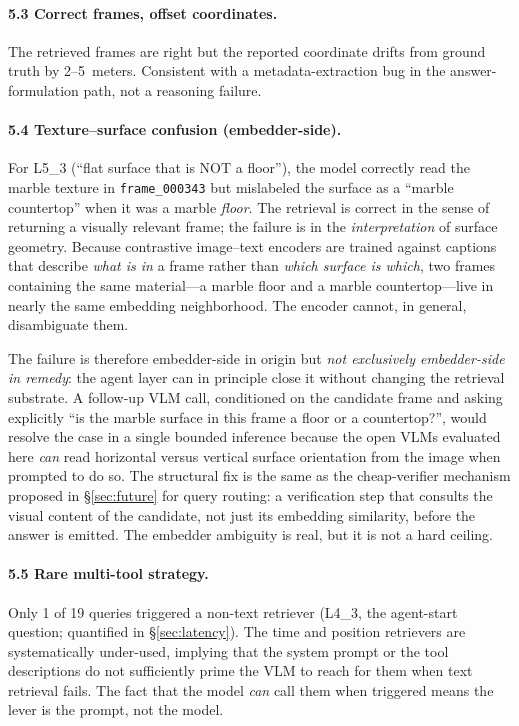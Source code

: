 \documentclass[12pt,letterpaper,oneside]{article}
\begin{document}
\paragraph{5.3 Correct frames, offset coordinates.}
The retrieved frames are right but the reported coordinate drifts
from ground truth by 2--5~meters.  Consistent with a metadata-extraction
bug in the answer-formulation path, not a reasoning failure.

\paragraph{5.4 Texture--surface confusion (embedder-side).}
For L5\_3 (``flat surface that is NOT a floor''), the model correctly
read the marble texture in \texttt{frame\_000343} but mislabeled the
surface as a ``marble countertop'' when it was a marble \emph{floor}.
The retrieval is correct in the sense of returning a visually relevant
frame; the failure is in the \emph{interpretation} of surface
geometry.  Because contrastive image--text encoders are trained against
captions that describe \emph{what is in} a frame rather than
\emph{which surface is which}, two frames containing the same
material---a marble floor and a marble countertop---live in nearly
the same embedding neighborhood.  The encoder cannot, in general,
disambiguate them.

The failure is therefore embedder-side in origin but
\emph{not exclusively embedder-side in remedy}: the agent layer can
in principle close it without changing the retrieval substrate.  A
follow-up VLM call, conditioned on the candidate frame and asking
explicitly ``is the marble surface in this frame a floor or a
countertop?'', would resolve the case in a single bounded inference
because the open VLMs evaluated here \emph{can} read horizontal
versus vertical surface orientation from the image when prompted to
do so.  The structural fix is the same as the cheap-verifier mechanism
proposed in \S\ref{sec:future} for query routing: a verification step
that consults the visual content of the candidate, not just its
embedding similarity, before the answer is emitted.  The embedder
ambiguity is real, but it is not a hard ceiling.

\paragraph{5.5 Rare multi-tool strategy.}
Only 1 of 19 queries triggered a non-text retriever (L4\_3, the
agent-start question; quantified in \S\ref{sec:latency}).  The time
and position retrievers are systematically under-used, implying
that the system prompt or the tool descriptions do not sufficiently
prime the VLM to reach for them when text retrieval fails.  The
fact that the model \emph{can} call them when triggered means the
lever is the prompt, not the model.
\end{document}
